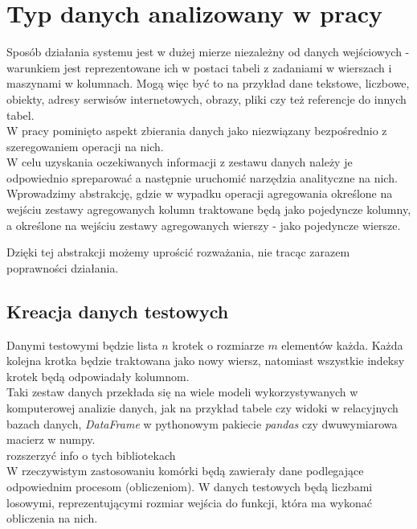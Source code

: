 \documentclass[brudnopis]{xmgr}
\begin{document}
\chapter{Typ danych analizowany w pracy}

Sposób działania systemu jest w dużej mierze niezależny od danych wejściowych - warunkiem jest reprezentowane ich w postaci tabeli z zadaniami w wierszach i maszynami w kolumnach.
Mogą więc być to na przykład dane tekstowe, liczbowe, obiekty, adresy serwisów internetowych, obrazy, pliki czy też referencje do innych tabel.
\medskip\\

W pracy pominięto aspekt zbierania danych jako niezwiązany bezpośrednio z szeregowaniem operacji na nich.
\medskip\\

W celu uzyskania oczekiwanych informacji z zestawu danych należy je odpowiednio spreparować a następnie uruchomić narzędzia analityczne na nich.
\medskip\\

Wprowadzimy abstrakcję, gdzie w wypadku operacji agregowania określone na wejściu zestawy agregowanych kolumn traktowane będą jako pojedyncze kolumny, a określone na wejściu zestawy agregowanych wierszy - jako pojedyncze wiersze.

Dzięki tej abstrakcji możemy uprościć rozważania, nie tracąc zarazem poprawności działania.

\section{Kreacja danych testowych}

Danymi testowymi będzie lista $n$ krotek o rozmiarze $m$ elementów każda.
Każda kolejna krotka będzie traktowana jako nowy wiersz, natomiast wszystkie indeksy krotek będą odpowiadały kolumnom. 
\medskip\\

Taki zestaw danych przekłada się na wiele modeli wykorzystywanych w komputerowej analizie danych, jak na przykład tabele czy widoki w relacyjnych bazach danych, \emph{DataFrame} w pythonowym pakiecie \emph{pandas} czy dwuwymiarowa macierz w numpy.
\medskip\\
rozszerzyć info o tych bibliotekach
\medskip\\

W rzeczywistym zastosowaniu komórki będą zawierały dane podlegające odpowiednim procesom (obliczeniom).
W danych testowych będą liczbami losowymi, reprezentującymi rozmiar wejścia do funkcji, która ma wykonać obliczenia na nich.
\medskip\\
\end{document}
